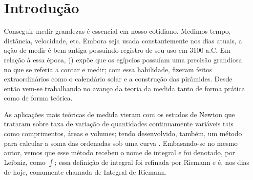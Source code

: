 




\chapter{Introdução}
    Conseguir medir grandezas é essencial em nosso cotidiano.
    Medimos tempo, distância, velocidade, etc.
    Embora seja usada constantemente nos dias atuais, a ação de medir é bem antiga possuindo registro de seu uso em 3100 a.C.
    Em relação à essa época, \citeauthor{boy}(\citeyear{boy}) expõe que os egípcios possuíam uma precisão grandiosa no que se referia a contar e medir;
    com essa habilidade, fizeram feitos extraordinários como o calendário solar e a construção das pirâmides.
    Desde então vem-se trabalhando no avanço da teoria da medida tanto de forma prática como de forma teórica.
    
    As aplicações mais teóricas de medida vieram com os estudos de Newton que trataram sobre taxa de variação de quantidades continuamente variáveis tais como
    comprimentos, áreas e volumes; tendo desenvolvido, também, um método para calcular a soma das ordenadas sob uma curva \cite{boy}. 
    Embasando-se no mesmo autor, vemos que esse método recebeu o nome de integral e foi denotado, por Leibniz, como $\displaystyle \int$; essa definição de integral foi refinada por Riemann e é, nos dias de hoje, comumente chamada de Integral de Riemann. 
    
